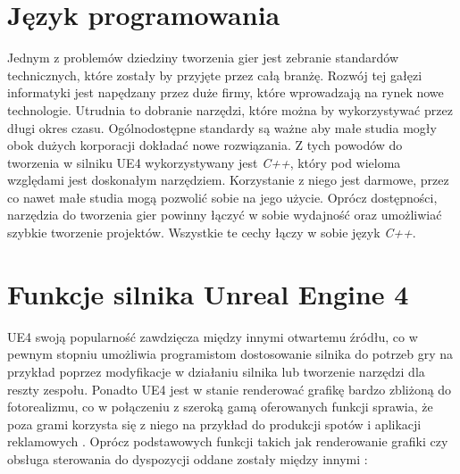 \documentclass[multip]{SGGW-thesis}
\begin{document}
\section{Język programowania}
Jednym z problemów dziedziny tworzenia gier jest zebranie standardów technicznych,  które zostały by przyjęte przez całą branżę. Rozwój tej gałęzi informatyki jest napędzany przez duże firmy, które wprowadzają na rynek nowe technologie. Utrudnia to dobranie narzędzi, które można by wykorzystywać przez długi okres czasu\cite{perelki}. Ogólnodostępne standardy są ważne aby małe studia mogły obok dużych korporacji dokładać nowe rozwiązania. Z tych powodów do tworzenia w silniku UE4 wykorzystywany jest {\em C++}, który pod wieloma względami jest doskonałym narzędziem. Korzystanie z niego jest darmowe, przez co nawet małe studia mogą pozwolić sobie na jego użycie. Oprócz dostępności, narzędzia do tworzenia gier powinny łączyć w sobie wydajność oraz umożliwiać szybkie tworzenie projektów. Wszystkie te cechy łączy w sobie język {\em C++}\cite{szkolacpp}.


\section{Funkcje silnika Unreal Engine 4}
UE4 swoją popularność zawdzięcza między innymi otwartemu źródłu, co w pewnym stopniu umożliwia programistom dostosowanie silnika do potrzeb gry na przykład poprzez modyfikacje w działaniu silnika lub tworzenie narzędzi dla reszty zespołu. Ponadto UE4 jest w stanie renderować grafikę bardzo zbliżoną do fotorealizmu, co w połączeniu z szeroką gamą oferowanych funkcji sprawia, że poza grami korzysta się z niego na przykład do produkcji spotów i aplikacji reklamowych \cite{the-human-race}\cite{ikea-vr}.
\newline \indent Oprócz podstawowych funkcji takich jak renderowanie grafiki czy obsługa sterowania do dyspozycji oddane zostały między innymi \cite{docs-ue4-features}:
\end{document}
